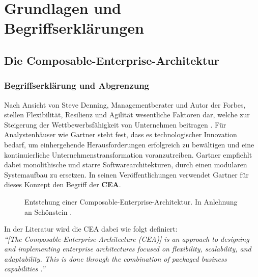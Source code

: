\section{Grundlagen und Begriffserklärungen}

\subsection{Die Composable-Enterprise-Architektur}

\subsubsection{Begriffserklärung und Abgrenzung}
\label{sec:CEA_B}
Nach Ansicht von Steve Denning, Managementberater und Autor der Forbes, stellen Flexibilität, Resilienz und Agilität wesentliche Faktoren dar, welche zur Steigerung der Wettbewerbsfähigkeit von Unternehmen beitragen \cite{Denning.20170210}. Für Analystenhäuser wie Gartner steht fest, dass es technologischer Innovation bedarf, um einhergehende Herausforderungen erfolgreich zu bewältigen und eine kontinuierliche Unternehmenstransformation voranzutreiben. Gartner empfiehlt dabei monolithische und starre Softwarearchitekturen, durch einen modularen Systemaufbau zu ersetzen. In seinen Veröffentlichungen verwendet Gartner für dieses Konzept den Begriff der \textbf{\ac{CEA}}.
\begin{center}
	\begin{figure}[H]
		\centering
		\caption[Entstehung einer Composable-Enterprise-Architektur]{Entstehung einer Composable-Enterprise-Architektur. In Anlehnung an Schönstein \cite{Schonenstein.20230103}.}
		\label{fig:CEA_S}
	\end{figure}	
\end{center}
\vspace*{-15mm}
In der Literatur wird die CEA dabei wie folgt definiert:\vspace{2mm}\\
\textit{\enquote{[The Composable-Enterprise-Architecture (CEA)] is an approach to designing and implementing enterprise architectures focused on flexibility, scalability, and adaptability. This is done through the combination of packaged business capabilities \cite{Gartner.20230418}\cite{MuleSoft.20230427}.}}\vspace{2mm}\\
